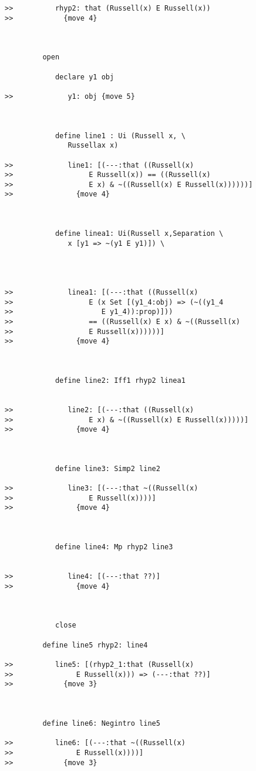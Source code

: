 \documentclass[12pt]{article}
\begin{document}
\begin{verbatim}
>>          rhyp2: that (Russell(x) E Russell(x))
>>            {move 4}



         open

            declare y1 obj

>>             y1: obj {move 5}



            define line1 : Ui (Russell x, \
               Russellax x)

>>             line1: [(---:that ((Russell(x)
>>                  E Russell(x)) == ((Russell(x)
>>                  E x) & ~((Russell(x) E Russell(x))))))]
>>               {move 4}



            define linea1: Ui(Russell x,Separation \
               x [y1 => ~(y1 E y1)]) \
               



>>             linea1: [(---:that ((Russell(x)
>>                  E (x Set [(y1_4:obj) => (~((y1_4
>>                     E y1_4)):prop)]))
>>                  == ((Russell(x) E x) & ~((Russell(x)
>>                  E Russell(x))))))]
>>               {move 4}



            define line2: Iff1 rhyp2 linea1


>>             line2: [(---:that ((Russell(x)
>>                  E x) & ~((Russell(x) E Russell(x)))))]
>>               {move 4}



            define line3: Simp2 line2

>>             line3: [(---:that ~((Russell(x)
>>                  E Russell(x))))]
>>               {move 4}



            define line4: Mp rhyp2 line3


>>             line4: [(---:that ??)]
>>               {move 4}



            close

         define line5 rhyp2: line4

>>          line5: [(rhyp2_1:that (Russell(x)
>>               E Russell(x))) => (---:that ??)]
>>            {move 3}



         define line6: Negintro line5

>>          line6: [(---:that ~((Russell(x)
>>               E Russell(x))))]
>>            {move 3}




\end{verbatim}
\end{document}
